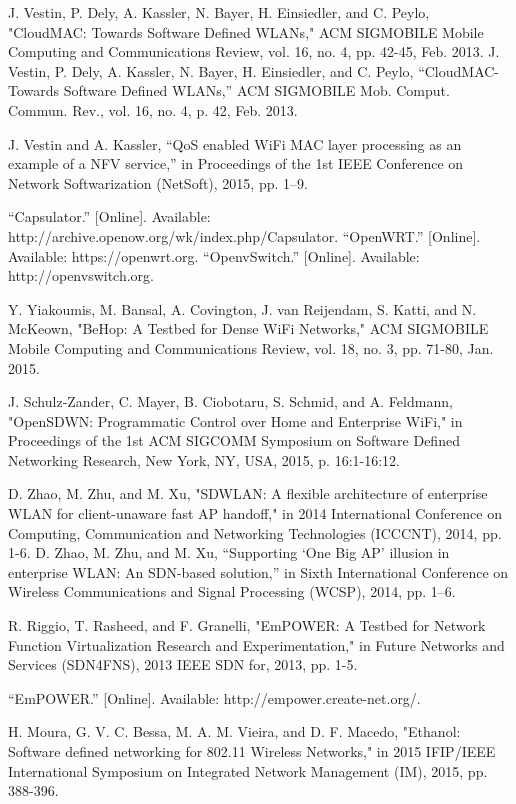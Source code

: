 \begin{thebibliography}{1}
 J. Vestin, P. Dely, A. Kassler, N. Bayer, H. Einsiedler, and C. Peylo, "CloudMAC: Towards Software Defined WLANs," ACM SIGMOBILE Mobile Computing and Communications Review, vol. 16, no. 4, pp. 42-45, Feb. 2013.
 J. Vestin, P. Dely, A. Kassler, N. Bayer, H. Einsiedler, and C. Peylo, “CloudMAC- Towards Software Defined WLANs,” ACM SIGMOBILE Mob. Comput. Commun. Rev., vol. 16, no. 4, p. 42, Feb. 2013.

 J. Vestin and A. Kassler, “QoS enabled WiFi MAC layer processing as an example of a NFV service,” in Proceedings of the 1st IEEE Conference on Network Softwarization (NetSoft), 2015, pp. 1–9.

 “Capsulator.” [Online]. Available: http://archive.openow.org/wk/index.php/Capsulator.
 “OpenWRT.” [Online]. Available: https://openwrt.org.
 “OpenvSwitch.” [Online]. Available: http://openvswitch.org.

 Y. Yiakoumis, M. Bansal, A. Covington, J. van Reijendam, S. Katti, and N. McKeown, "BeHop: A Testbed for Dense WiFi Networks," ACM SIGMOBILE Mobile Computing and Communications Review, vol. 18, no. 3, pp. 71-80, Jan. 2015.

 J. Schulz-Zander, C. Mayer, B. Ciobotaru, S. Schmid, and A. Feldmann, "OpenSDWN: Programmatic Control over Home and Enterprise WiFi," in Proceedings of the 1st ACM SIGCOMM Symposium on Software Defined Networking Research, New York, NY, USA, 2015, p. 16:1-16:12.

 D. Zhao, M. Zhu, and M. Xu, "SDWLAN: A flexible architecture of enterprise WLAN for client-unaware fast AP handoff," in 2014 International Conference on Computing, Communication and Networking Technologies (ICCCNT), 2014, pp. 1-6.
 D. Zhao, M. Zhu, and M. Xu, “Supporting ‘One Big AP’ illusion in enterprise WLAN: An SDN-based solution,” in Sixth International Conference on Wireless Communications and Signal Processing (WCSP), 2014, pp. 1–6.


 R. Riggio, T. Rasheed, and F. Granelli, "EmPOWER: A Testbed for Network Function Virtualization Research and Experimentation," in Future Networks and Services (SDN4FNS), 2013 IEEE SDN for, 2013, pp. 1-5.

 “EmPOWER.” [Online]. Available: http://empower.create-net.org/.


 H. Moura, G. V. C. Bessa, M. A. M. Vieira, and D. F. Macedo, "Ethanol: Software defined networking for 802.11 Wireless Networks," in 2015 IFIP/IEEE International Symposium on Integrated Network Management (IM), 2015, pp. 388-396.


\end{thebibliography}
